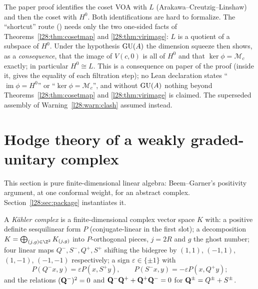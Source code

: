 \begin{remark}\label{l28:rem:noacl}
The paper proof identifies the coset VOA with $L$ (Arakawa--Creutzig--Linshaw) and then the coset with $H^0$. Both identifications are hard
to formalize. The ``shortcut'' route () needs only the two one-sided facts of Theorems~\ref{l28:thm:cosetmap} and
\ref{l28:thm:virimage}: $L$ is a quotient of a subspace of $H^0$. Under the hypothesis $\mathrm{GU}(A)$ the dimension
squeeze then shows, as a \emph{consequence}, that the image of $V(c,0)$ is all of $H^0$ and that $\ker\phi=\mathcal M_c$ exactly; in particular
$H^0\cong L$. This is a consequence on paper of the proof (inside it,  gives the equality of each filtration step);
no Lean declaration states ``$\operatorname{im}\phi=H^0$'' or ``$\ker\phi=\mathcal M_c$'', and without $\mathrm{GU}(A)$ nothing beyond
Theorems~\ref{l28:thm:cosetmap} and \ref{l28:thm:virimage} is claimed. The superseded assembly of
Warning~\ref{l28:warn:clash} assumed  instead.
\end{remark}

\section{Hodge theory of a weakly graded-unitary complex}\label{l28:sec:hodge}

This section is pure finite-dimensional linear algebra: Beem--Garner's positivity argument, at one conformal weight, for an abstract
complex. Section~\ref{l28:sec:package} instantiates it.

\begin{definition}\label{l28:def:kahler}
A \emph{Kähler complex} is a finite-dimensional complex vector space $K$ with:
a positive definite sesquilinear form $P$ (conjugate-linear in the first slot); a decomposition $K=\bigoplus_{(j,g)\in\Z^2}K_{(j,g)}$
into $P$-orthogonal pieces, $j=2R$ and $g$ the ghost number; four linear maps $Q^-,S^-,Q^+,S^+$ shifting the bidegree by $(1,1)$,
$(-1,1)$, $(1,-1)$, $(-1,-1)$ respectively; a sign $\varepsilon\in\{\pm1\}$ with
\begin{equation*}
P(Q^-x,y)=\varepsilon P(x,S^+y),\qquad P(S^-x,y)=-\varepsilon P(x,Q^+y);
\end{equation*}
and the relations $(\mathbf Q^-)^2=0$ and $\mathbf Q^-\mathbf Q^++\mathbf Q^+\mathbf Q^-=0$ for
$\mathbf Q^\pm=Q^\pm+S^\pm$.
\end{definition}

